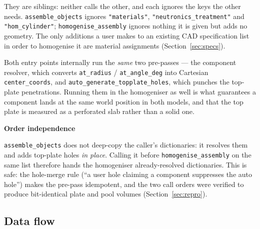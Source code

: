\documentclass[9pt,a4paper]{extarticle}
\newcommand{\code}[1]{\texttt{\small #1}}
\newenvironment{caveat}[1]%
  {\par\medskip\noindent
   \begin{lrbox}{\caveatbox}%
   \begin{minipage}{\dimexpr\linewidth-2\fboxsep-2\fboxrule\relax}%
   \textbf{#1}\par\medskip}%
  {\end{minipage}%
   \end{lrbox}%
   \fcolorbox{warnrule}{warnbg}{\usebox{\caveatbox}}\par\medskip}
\begin{document}
\noindent
They are siblings: neither calls the other, and each ignores the keys the other
needs. \code{assemble\_objects} ignores \code{"materials"},
\code{"neutronics\_treatment"} and \code{"hom\_cylinder"};
\code{homogenise\_assembly} ignores nothing it is given but adds no geometry.
The only additions a user makes to an existing CAD specification list in order
to homogenise it are material assignments (Section~\ref{sec:specs}).

Both entry points internally run the \emph{same} two pre-passes --- the
component resolver, which converts \code{at\_radius} / \code{at\_angle\_deg}
into Cartesian \code{center\_coords}, and \code{auto\_generate\_topplate\_holes},
which punches the top-plate penetrations. Running them in the homogeniser as
well is what guarantees a component lands at the same world position in both
models, and that the top plate is measured as a perforated slab rather than a
solid one.

\begin{caveat}{Order independence}
\code{assemble\_objects} does not deep-copy the caller's dictionaries: it
resolves them and adds top-plate holes \emph{in place}. Calling it before
\code{homogenise\_assembly} on the same list therefore hands the homogeniser
already-resolved dictionaries. This is safe: the hole-merge rule
(``a user hole claiming a component suppresses the auto hole'') makes the
pre-pass idempotent, and the two call orders were verified to produce
bit-identical plate and pool volumes (Section~\ref{sec:repro}).
\end{caveat}

\subsection{Data flow}
\end{document}
